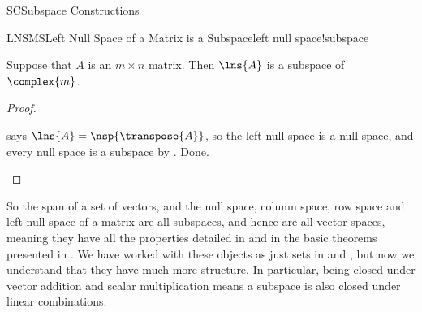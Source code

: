 \begin{subsect}{SC}{Subspace Constructions}
%
\begin{theorem}{LNSMS}{Left Null Space of a Matrix is a Subspace}{left null space!subspace}
\begin{para}Suppose that $A$ is an $m\times n$ matrix.  Then $\lns{A}$ is a subspace of $\complex{m}$.\end{para}
\end{theorem}
%
\begin{proof}
\begin{para} says $\lns{A}=\nsp{\transpose{A}}$, so the left null space is a null space, and every null space is a subspace by .  Done.\end{para}
\end{proof}
%
\begin{para}So the span of a set of vectors, and the null space, column space, row space and left null space of a matrix are all subspaces, and hence are all vector spaces, meaning they have all the properties detailed in  and in the basic theorems presented in .  We have worked with these objects as just sets in  and , but now we understand that they have much more structure.  In particular, being closed under vector addition and scalar multiplication means a subspace is also closed under linear combinations.\end{para}
%
%
\end{subsect}
%

